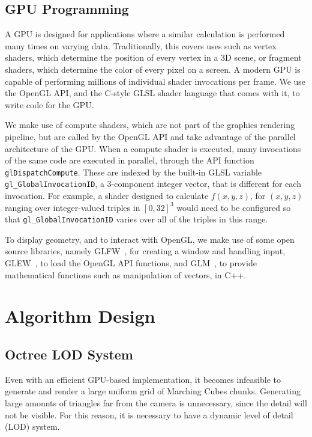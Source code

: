 \documentclass[11pt]{article}
\begin{document}
\subsection{GPU Programming} 
A GPU is designed for applications where a similar calculation is performed many times on varying data. Traditionally, this covers uses such as vertex shaders, which determine the position of every vertex in a 3D scene, or fragment shaders, which determine the color of every pixel on a screen. A modern GPU is capable of performing millions of individual shader invocations per frame. We use the OpenGL API, and the C-style GLSL shader language that comes with it, to write code for the GPU.

We make use of compute shaders, which are not part of the graphics rendering pipeline, but are called by the OpenGL API and take advantage of the parallel architecture of the GPU. When a compute shader is executed, many invocations of the same code are executed in parallel, through the API function \texttt{glDispatchCompute}. These are indexed by the built-in GLSL variable \texttt{gl\_GlobalInvocationID}, a 3-component integer vector, that is different for each invocation. For example, a shader designed to calculate $f\left(x,y,z\right)$, for $ \left(x,y,z\right)$ ranging over integer-valued triples in $\left[0,32\right]^3$ would need to be configured so that \texttt{gl\_GlobalInvocationID} varies over all of the triples in this range.

To display geometry, and to interact with OpenGL, we make use of some open source libraries, namely GLFW~\cite{glfw}, for creating a window and handling input, GLEW~\cite{glew}, to load the OpenGL API functions, and GLM~\cite{g-truc_2005}, to provide mathematical functions such as manipulation of vectors, in C++.


\section{Algorithm Design}

\subsection{Octree LOD System}
\label{section:octree}
Even with an efficient GPU-based implementation, it becomes infeasible to generate and render a large uniform grid of Marching Cubes chunks. Generating large amounts of triangles far from the camera is unnecessary, since the detail will not be visible. For this reason, it is necessary to have a dynamic level of detail (LOD) system.
\end{document}
